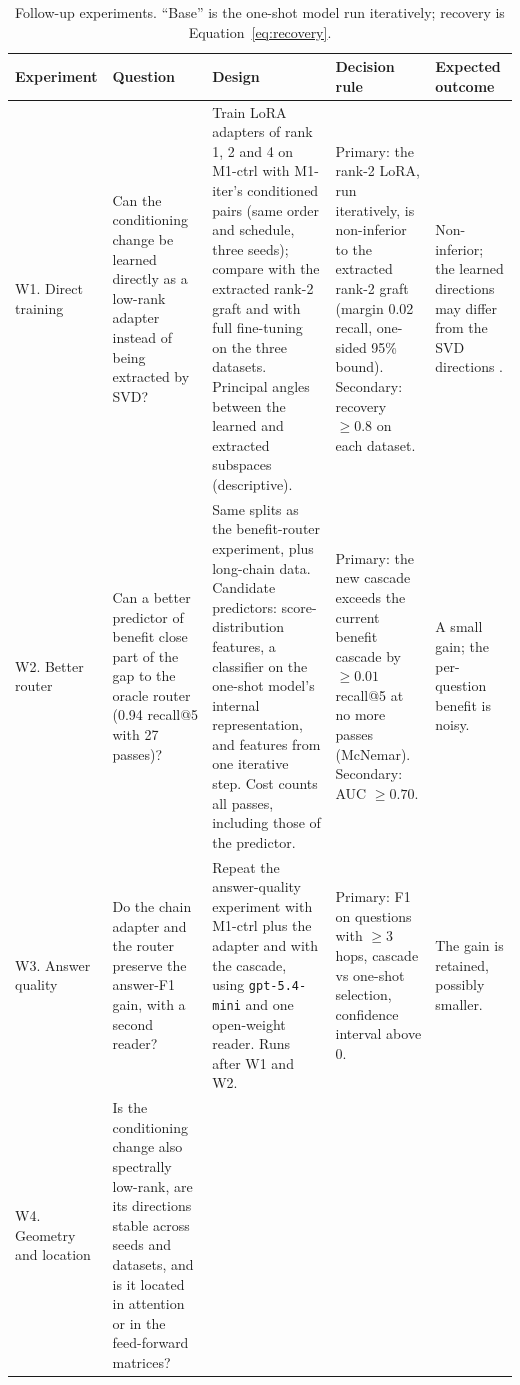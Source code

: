 \begin{table}[htbp]
\centering
\caption{Follow-up experiments. ``Base'' is the one-shot model run iteratively; recovery is Equation~\ref{eq:recovery}.}
\label{tab:followups}
\scriptsize
\begin{tabularx}{\textwidth}{>{\raggedright\arraybackslash}p{1.5cm}>{\raggedright\arraybackslash}X>{\raggedright\arraybackslash}X>{\raggedright\arraybackslash}X>{\raggedright\arraybackslash}p{2.3cm}}
\toprule
Experiment & Question & Design & Decision rule & Expected outcome \\
\midrule
W1. Direct training &
Can the conditioning change be learned directly as a low-rank adapter instead of being extracted by SVD? &
Train LoRA adapters \cite{hu2022lora} of rank 1, 2 and 4 on M1-ctrl with M1-iter's conditioned pairs (same order and schedule, three seeds); compare with the extracted rank-2 graft and with full fine-tuning on the three datasets. Principal angles between the learned and extracted subspaces (descriptive). &
Primary: the rank-2 LoRA, run iteratively, is non-inferior to the extracted rank-2 graft (margin 0.02 recall, one-sided 95\% bound). Secondary: recovery $\ge 0.8$ on each dataset. &
Non-inferior; the learned directions may differ from the SVD directions \cite{biderman2024loralearnsless,shuttleworth2025illusion}. \\
\addlinespace
W2. Better router &
Can a better predictor of benefit close part of the gap to the oracle router (0.94 recall@5 with 27 passes)? &
Same splits as the benefit-router experiment, plus long-chain data. Candidate predictors: score-distribution features, a classifier on the one-shot model's internal representation, and features from one iterative step. Cost counts all passes, including those of the predictor. &
Primary: the new cascade exceeds the current benefit cascade by $\ge 0.01$ recall@5 at no more passes (McNemar). Secondary: AUC $\ge 0.70$. &
A small gain; the per-question benefit is noisy. \\
\addlinespace
W3. Answer quality &
Do the chain adapter and the router preserve the answer-F1 gain, with a second reader? &
Repeat the answer-quality experiment with M1-ctrl plus the adapter and with the cascade, using \texttt{gpt-5.4-mini} and one open-weight reader. Runs after W1 and W2. &
Primary: F1 on questions with $\ge 3$ hops, cascade vs one-shot selection, confidence interval above 0. &
The gain is retained, possibly smaller. \\
\addlinespace
W4. Geometry and location &
Is the conditioning change also spectrally low-rank, are its directions stable across seeds and datasets, and is it located in attention or in the feed-forward matrices? &

\end{tabularx}
\end{table}
